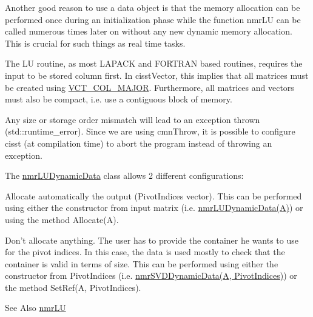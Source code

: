 Another good reason to use a data object is that the memory allocation can be performed once during an initialization phase while the function nmr\-L\-U can be called numerous times later on without any new dynamic memory allocation. This is crucial for such things as real time tasks.

The L\-U routine, as most L\-A\-P\-A\-C\-K and F\-O\-R\-T\-R\-A\-N based routines, requires the input to be stored column first. In cisst\-Vector, this implies that all matrices must be created using \hyperlink{vct_forward_declarations_8h_a432cdf8923afaf82f551450ad4034746}{V\-C\-T\-\_\-\-C\-O\-L\-\_\-\-M\-A\-J\-O\-R}. Furthermore, all matrices and vectors must also be compact, i.\-e. use a contiguous block of memory.

Any size or storage order mismatch will lead to an exception thrown (std\-::runtime\-\_\-error). Since we are using cmn\-Throw, it is possible to configure cisst (at compilation time) to abort the program instead of throwing an exception.

The \hyperlink{classnmr_l_u_dynamic_data}{nmr\-L\-U\-Dynamic\-Data} class allows 2 different configurations\-:


\begin{DoxyItemize}
\item Allocate automatically the output (Pivot\-Indices vector). This can be performed using either the constructor from input matrix (i.\-e. \hyperlink{classnmr_l_u_dynamic_data}{nmr\-L\-U\-Dynamic\-Data(\-A)}) or using the method Allocate(\-A).
\item Don't allocate anything. The user has to provide the container he wants to use for the pivot indices. In this case, the data is used mostly to check that the container is valid in terms of size. This can be performed using either the constructor from Pivot\-Indices (i.\-e. \hyperlink{classnmr_s_v_d_dynamic_data}{nmr\-S\-V\-D\-Dynamic\-Data(\-A, Pivot\-Indices)}) or the method Set\-Ref(\-A, Pivot\-Indices).
\end{DoxyItemize}

\begin{DoxySeeAlso}{See Also}
\hyperlink{nmr_l_u_8h_a66bf403c705953a781e940cf1b674d5f}{nmr\-L\-U} 
\end{DoxySeeAlso}


